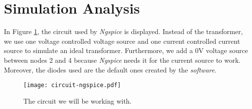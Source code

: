 \clearpage

\section{Simulation Analysis}
\label{sec:simulation}

In Figure \ref{fig:circuit-ngspice}, the circuit used by \textit{Ngspice} is displayed. Instead of the transformer, we use one voltage controlled voltage source and one current controlled current source to simulate an ideal transformer. Furthermore, we add a 0V voltage source between nodes 2 and 4 because \textit{Ngspice} needs it for the current source to work. Moreover, the diodes used are the default ones created by the \textit{software}.

\begin{figure}[h] \centering
\texttt{[image: circuit-ngspice.pdf]}
\caption{The circuit we will be working with.}
\label{fig:circuit-ngspice}
\end{figure}